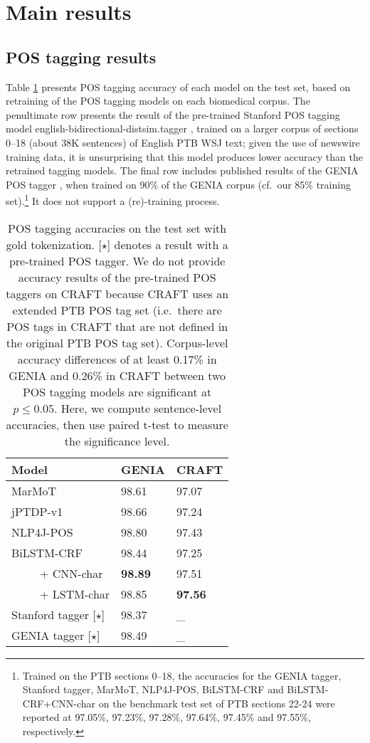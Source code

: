 \documentclass[twocolumn,hyperref]{bmcart}\pdfoutput=1
\newcommand{\CHANGEA}[1]{#1}
\begin{document}
\section*{Main results}

\subsection*{POS tagging results}
\label{ssec:pos}

Table \ref{tab:POSresults} presents POS tagging accuracy of each model on the test set, based on retraining of the POS tagging models on each biomedical corpus.  
The penultimate row  presents the result of the pre-trained Stanford POS tagging model \textsf{{english-bidirectional-distsim.tagger}} \cite{Toutanova:2003:FPT:1073445.1073478}, 
 trained  on a larger corpus of sections 0--18 (about 38K sentences) of English PTB WSJ text; 
given the use of newswire training data, \CHANGEA{it is unsurprising} that this model produces lower accuracy than the retrained  tagging  models.  
The final row includes published results of the 
GENIA POS tagger \cite{11573036_36}, when trained on  90\% of the GENIA corpus (cf.\ our 85\% training set).\footnote{Trained on the PTB sections 0--18, the accuracies for the GENIA tagger,   Stanford  tagger, MarMoT, NLP4J-POS, BiLSTM-CRF and  BiLSTM-CRF+CNN-char   on the benchmark test set of   PTB  sections 22-24  were reported at 97.05\%,  97.23\%, 97.28\%, 97.64\%, 97.45\% and 97.55\%, respectively.}    It does not support a (re)-training process.
 

 \begin{table}[!t]
 \caption{POS tagging accuracies on the test set  with gold tokenization. [$\star$]  denotes a result with a pre-trained  POS tagger. \CHANGEA{We do not provide accuracy results of the pre-trained  POS taggers on CRAFT because CRAFT uses an extended PTB POS tag set (i.e.\ there are POS tags in CRAFT that are not defined in the original PTB POS tag set). Corpus-level accuracy differences of at least 0.17\% in GENIA and 0.26\% in CRAFT between two POS tagging models are significant at $p \leq 0.05$. Here, we  compute sentence-level accuracies, then use paired t-test to measure the significance level.}}
\centering
\def\arraystretch{1.05}
\begin{tabular}{l|l|l}
\hline
\textbf{Model} & \textbf{GENIA} & \textbf{CRAFT} \\
\hline 
MarMoT & 98.61 &	97.07 \\
 jPTDP-v1 &  98.66	& 97.24 \\
NLP4J-POS  & 98.80 & 97.43  \\
BiLSTM-CRF &  98.44	& 97.25   \\
 \ \ \ \ \ + CNN-char &  \textbf{98.89}	& 97.51  \\
 \ \ \ \ \ + LSTM-char & 98.85	 & \textbf{97.56}   \\
\hline
Stanford tagger [$\star$] & 98.37 & \_ \\
GENIA tagger [$\star$] & 98.49 & \_ \\
\hline
\end{tabular}
\label{tab:POSresults}
\end{table}
\end{document}
